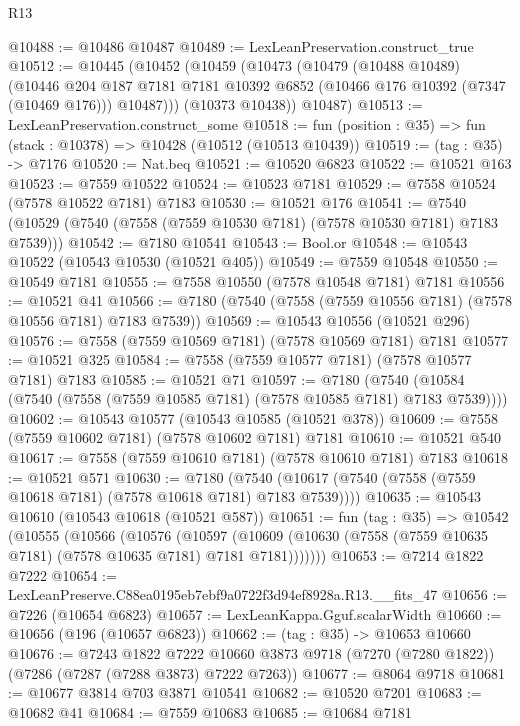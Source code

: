 \begin{lexlean}{R13}
\begin{coremodule}
@10488 := @10486 @10487
@10489 := LexLeanPreservation.construct_true
@10512 := @10445
    (@10452
      (@10459
        (@10473
          (@10479
            (@10488 @10489)
            (@10446
              @204
              @187
              @7181
              @7181
              @10392
              @6852
              (@10466 @176 @10392 (@7347 (@10469 @176)))
              @10487)))
        (@10373 @10438))
      @10487)
@10513 := LexLeanPreservation.construct_some
@10518 := fun (position : @35) => fun (stack : @10378) => @10428 (@10512 (@10513 @10439))
@10519 := (tag : @35) -> @7176
@10520 := Nat.beq
@10521 := @10520 @6823
@10522 := @10521 @163
@10523 := @7559 @10522
@10524 := @10523 @7181
@10529 := @7558 @10524 (@7578 @10522 @7181) @7183
@10530 := @10521 @176
@10541 := @7540 (@10529 (@7540 (@7558 (@7559 @10530 @7181) (@7578 @10530 @7181) @7183 @7539)))
@10542 := @7180 @10541
@10543 := Bool.or
@10548 := @10543 @10522 (@10543 @10530 (@10521 @405))
@10549 := @7559 @10548
@10550 := @10549 @7181
@10555 := @7558 @10550 (@7578 @10548 @7181) @7181
@10556 := @10521 @41
@10566 := @7180 (@7540 (@7558 (@7559 @10556 @7181) (@7578 @10556 @7181) @7183 @7539))
@10569 := @10543 @10556 (@10521 @296)
@10576 := @7558 (@7559 @10569 @7181) (@7578 @10569 @7181) @7181
@10577 := @10521 @325
@10584 := @7558 (@7559 @10577 @7181) (@7578 @10577 @7181) @7183
@10585 := @10521 @71
@10597 := @7180
    (@7540 (@10584 (@7540 (@7558 (@7559 @10585 @7181) (@7578 @10585 @7181) @7183 @7539))))
@10602 := @10543 @10577 (@10543 @10585 (@10521 @378))
@10609 := @7558 (@7559 @10602 @7181) (@7578 @10602 @7181) @7181
@10610 := @10521 @540
@10617 := @7558 (@7559 @10610 @7181) (@7578 @10610 @7181) @7183
@10618 := @10521 @571
@10630 := @7180
    (@7540 (@10617 (@7540 (@7558 (@7559 @10618 @7181) (@7578 @10618 @7181) @7183 @7539))))
@10635 := @10543 @10610 (@10543 @10618 (@10521 @587))
@10651 := fun (tag : @35) =>
  @10542
    (@10555
      (@10566
        (@10576
          (@10597
            (@10609 (@10630 (@7558 (@7559 @10635 @7181) (@7578 @10635 @7181) @7181 @7181)))))))
@10653 := @7214 @1822 @7222
@10654 := LexLeanPreserve.C88ea0195eb7ebf9a0722f3d94ef8928a.R13.__fits_47
@10656 := @7226 (@10654 @6823)
@10657 := LexLeanKappa.Gguf.scalarWidth
@10660 := @10656 (@196 (@10657 @6823))
@10662 := (tag : @35) -> @10653 @10660
@10676 := @7243
    @1822
    @7222
    @10660
    @3873
    @9718
    (@7270 (@7280 @1822))
    (@7286 (@7287 (@7288 @3873) @7222 @7263))
@10677 := @8064 @9718
@10681 := @10677 @3814 @703 @3871 @10541
@10682 := @10520 @7201
@10683 := @10682 @41
@10684 := @7559 @10683
@10685 := @10684 @7181

\end{coremodule}
\end{lexlean}
